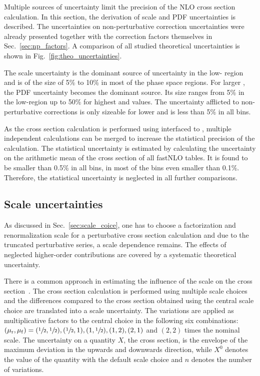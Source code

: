 Multiple sources of uncertainty limit the precision of the NLO cross section
calculation. In this section, the derivation of scale and PDF
uncertainties is described. The uncertainties
on non-perturbative correction uncertainties were already presented together
with the correction factors themselves in Sec.~\ref{sec:np_factors}. A
comparison of all studied theoretical uncertainties is shown in
Fig.~\ref{fig:theo_uncertainties}.

The scale uncertainty is the dominant source of uncertainty in the low-\pt
region and is of the size of 5\% to 10\% in most of the phase space regions. For
larger \ptavg, the PDF uncertainty becomes the dominant source. Its size ranges
from 5\% in the low-\ptavg region up to 50\% for highest \ptavg and \yboost
values. The uncertainty afflicted to non-perturbative corrections is only
sizeable for lower \pt and is less than 5\% in all bins.

As the cross section calculation is performed using \fastNLO interfaced to
\NLOJETPP, multiple independent calculations can be merged to increase the
statistical precision of the calculation. The statistical uncertainty is
estimated by calculating the uncertainty on the arithmetic mean of the cross
section of all fastNLO tables. It is found to be smaller than 0.5\% in all bins,
in most of the bins even smaller than 0.1\%. Therefore, the statistical
uncertainty is neglected in all further comparisons.

\subsection{Scale uncertainties}
\label{sec:scale_uncertainties}

As discussed in Sec.~\ref{sec:scale_coice}, one has to choose a factorization
and renormalization scale for a perturbative cross section calculation and due to
the truncated perturbative series, a scale dependence remains. The effects of
neglected higher-order contributions are covered by a systematic theoretical
uncertainty.

There is a common approach in estimating the influence of the scale on the cross
section~\cite{Cacciari:2003fi}. The cross section calculation is performed using
multiple scale choices and the differences compared to the cross section
obtained using the central scale choice are translated into a scale uncertainty.
The variations are applied as multiplicative factors to the central choice in
the following six combinations: $(\mu_{\mathrm{r}}, \mu_{\mathrm{f}}) = (\sfrac{1}{2}, \sfrac{1}{2}),
(\sfrac{1}{2}, 1), (1, \sfrac{1}{2}), (1, 2), (2, 1)$ and $(2, 2)$ times the
nominal scale. The uncertainty on a quantity $X$, \eg the cross section, is the
envelope of the maximum deviation in the upwards and downwards direction, while
$X^0$ denotes the value of the quantity with the default scale choice and $n$
denotes the number of variations.

